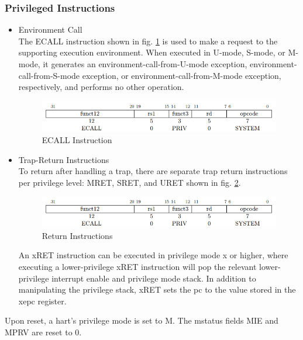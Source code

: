 \documentclass[../main.tex]{subfiles}
\begin{document}
\subsubsection{Privileged Instructions}

\begin{itemize}
    \item Environment Call\\
        The ECALL instruction shown in fig. \ref{fig:ecall} is used to make a request to the supporting execution environment. When executed in U-mode, S-mode, or M-mode, it generates an environment-call-from-U-mode exception, environment-call-from-S-mode exception, or environment-call-from-M-mode exception, respectively, and performs no other operation.\\
        \begin{figure}[h!]
            \centering
            \includegraphics[width=10 cm]{diagrams/ecall.png}
            \caption{ECALL Instruction}
            \label{fig:ecall}
        \end{figure}
            
    \item Trap-Return Instructions\\
        To return after handling a trap, there are separate trap return instructions per privilege level: MRET, SRET, and URET shown in fig. \ref{fig:ret}.\\
        \begin{figure}[h!]
            \centering
            \includegraphics[width=10 cm]{diagrams/ecall.png}
            \caption{Return Instructions}
            \label{fig:ret}
        \end{figure}
        An xRET instruction can be executed in privilege mode x or higher, where executing a lower-privilege xRET instruction will pop the relevant lower-privilege interrupt enable and privilege mode stack. In addition to manipulating the privilege stack, xRET sets the pc to the value stored in the xepc register.
\end{itemize}

Upon reset, a hart’s privilege mode is set to M. The mstatus fields MIE and MPRV are reset to 0.
\end{document}
